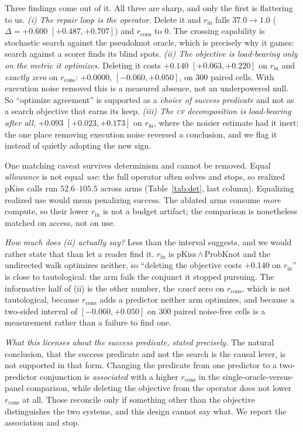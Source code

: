 \documentclass[11pt]{article}
\newcommand{\CF}{\textsc{cf}}
\begin{document}
Three findings come out of it. All three are sharp, and only the first is flattering to us. \emph{(i) The repair loop is the operator.} Delete
it and $r_{\mathrm{in}}$ falls $37.0\to1.0$ ($\Delta{=}{+}0.600$ $[{+}0.487,{+}0.707]$) and $r_{\mathrm{cons}}$
to $0$. The crossing capability is stochastic search against the pseudoknot oracle, which is precisely why it
games: search against a scorer finds its blind spots. \emph{(ii) The objective is load-bearing only on the
metric it optimizes.} Deleting it costs ${+}0.140$ $[{+}0.063,{+}0.220]$ on $r_{\mathrm{in}}$ and
\emph{exactly zero} on $r_{\mathrm{cons}}$: ${+}0.0000$, $[{-}0.060,{+}0.050]$, on $300$ paired cells. With
execution noise removed this is a measured absence, not an underpowered null. So ``optimize agreement'' is
supported as a \emph{choice of success predicate} and not as a search objective that earns its keep.
\emph{(iii) The \CF{} decomposition is load-bearing after all}, ${+}0.093$ $[{+}0.023,{+}0.173]$ on
$r_{\mathrm{in}}$, where the noisier estimate had it inert: the one place removing execution noise reversed a
conclusion, and we flag it instead of quietly adopting the new sign.

One matching caveat survives determinism and cannot be removed. Equal \emph{allowance} is not equal
\emph{use}: the full operator often solves and stops, so realized pKiss calls run $52.6$--$105.5$ across arms
(Table~\ref{tab:det}, last column). Equalizing realized use would mean penalizing success. The ablated arms
consume \emph{more} compute, so their lower $r_{\mathrm{in}}$ is not a budget artifact; the comparison is
nonetheless matched on access, not on use.

\emph{How much does (ii) actually say?} Less than the interval suggests, and we would rather state that than
let a reader find it. $r_{\mathrm{in}}$ is pKiss\,$\wedge$\,ProbKnot and the undirected walk optimizes
neither, so ``deleting the objective costs ${+}0.140$ on $r_{\mathrm{in}}$'' is close to tautological: the
arm fails the conjunct it stopped pursuing. The informative half of (ii) is the other number, the
\emph{exact} zero on $r_{\mathrm{cons}}$, which is not tautological, because $r_{\mathrm{cons}}$ adds a
predictor neither arm optimizes, and because a two-sided interval of $[{-}0.060,{+}0.050]$ on $300$ paired
noise-free cells is a measurement rather than a failure to find one.

\emph{What this licenses about the success predicate, stated precisely.} The natural conclusion, that the success predicate and not the search is the causal lever, is not supported in that form. Changing the
predicate from one predictor to a two-predictor conjunction is \emph{associated} with a higher
$r_{\mathrm{cons}}$ in the single-oracle-versus-panel comparison, while deleting the objective from the operator
does not lower $r_{\mathrm{cons}}$ at all. Those reconcile only if something other than the objective
distinguishes the two systems, and this design cannot say what. We report the association and stop.
\end{document}

